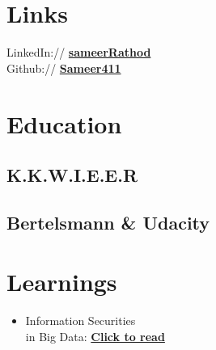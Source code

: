 \documentclass[]{sameer-resume-openfont}
\begin{document}
%
%
\lastupdated

%
%

%
%

\begin{minipage}[t]{0.33\textwidth} 


\section{Links} 
LinkedIn://  \href{https://www.linkedin.com/in/sameerrathod1999}{\bf sameerRathod} \\
Github:// \href{https://github.com/Sameer411}{\bf Sameer411} \\



\section{Education} 
        \subsection{K.K.W.I.E.E.R}
        \sectionsep
    
        \subsection{Bertelsmann \& Udacity}
    \sectionsep



\section{Learnings} 
    \begin{itemize}
        \item Information Securities \\ in Big Data:  \href{https://sameerathod.wordpress.com/}{\bf Click to read} 


\end{itemize}
\end{minipage}
\end{document}
